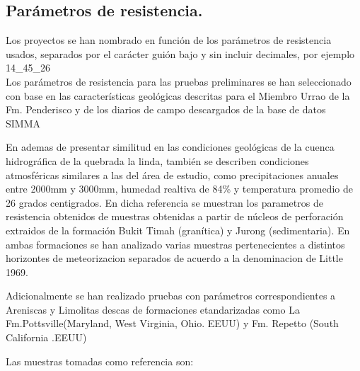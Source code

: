 \subsection{Par\'ametros de resistencia.}
Los proyectos se han nombrado en funci\'{o}n de los par\'{a}metros de resistencia usados,
separados por el car\'{a}cter gui\'{o}n bajo y sin incluir decimales, por ejemplo 14\_45\_26\\

Los par\'ametros de resistencia para las pruebas preliminares se han seleccionado con base en las caracter\'isticas geol\'ogicas descritas para el Miembro Urrao de la Fm. Penderisco y  de los diarios de campo descargados de la base de datos SIMMA \cite{libreta}

En \cite{singapore} ademas de presentar similitud en las condiciones geol\'ogicas de la cuenca hidrogr\'afica de la quebrada la linda, tambi\'en se describen condiciones atmosf\'ericas similares a las del \'area de estudio, como precipitaciones anuales entre 2000mm y 3000mm, humedad realtiva de 84\% y temperatura promedio de 26 grados centigrados.
\linebreak 
En dicha referencia se muestran los parametros de resistencia obtenidos de muestras obtenidas a partir de n\'ucleos de perforaci\'on extraidos de la formaci\'on Bukit Timah (gran\'itica) y Jurong (sedimentaria). En ambas formaciones se han analizado varias muestras pertenecientes a distintos horizontes de meteorizacion separados de acuerdo a la denominacion de Little 1969.

Adicionalmente se han realizado pruebas con par\'ametros correspondientes a Areniscas y Limolitas descas de formaciones etandarizadas como La Fm.Pottsville(Maryland, West Virginia, Ohio. EEUU) y Fm. Repetto (South California .EEUU) 

Las muestras tomadas como referencia son: 



